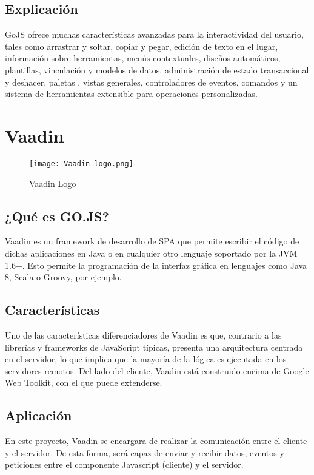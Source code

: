 	 	
	 		\subsection{Explicación}
	 		GoJS ofrece muchas características avanzadas para la interactividad del usuario, tales como arrastrar y soltar, copiar y pegar, edición de texto en el lugar, información sobre herramientas, menús contextuales, diseños automáticos, plantillas, vinculación y modelos de datos, administración de estado transaccional y deshacer, paletas , vistas generales, controladores de eventos, comandos y un sistema de herramientas extensible para operaciones personalizadas.
	 
	 
	 	\section{Vaadin}
	 	
	 		\begin{figure}[H]
	 			\centering
	 			\texttt{[image: Vaadin-logo.png]}
	 			\caption{Vaadin Logo}\label{fig:Vaadin-logo}
	 		\end{figure}
 		
 			\subsection{¿Qué es GO.JS?}
 				Vaadin\cite{vaadin} es un framework de desarrollo de SPA que permite escribir el código de dichas aplicaciones en Java o en cualquier otro lenguaje soportado por la JVM 1.6+. Esto permite la programación de la interfaz gráfica en lenguajes como Java 8, Scala o Groovy, por ejemplo.
 			
 			\subsection{Características}
 				Uno de las características diferenciadores de Vaadin es que, contrario a las librerías y frameworks de JavaScript típicas, presenta una arquitectura centrada en el servidor, lo que implica que la mayoría de la lógica es ejecutada en los servidores remotos. Del lado del cliente, Vaadin está construido encima de Google Web Toolkit, con el que puede extenderse.
 	
 			\subsection{Aplicación}
 				En este proyecto, Vaadin se encargara de realizar la comunicación entre el cliente y el servidor. De esta forma, será capaz de enviar y recibir datos, eventos y peticiones entre el componente Javascript (cliente) y el servidor.
 			
